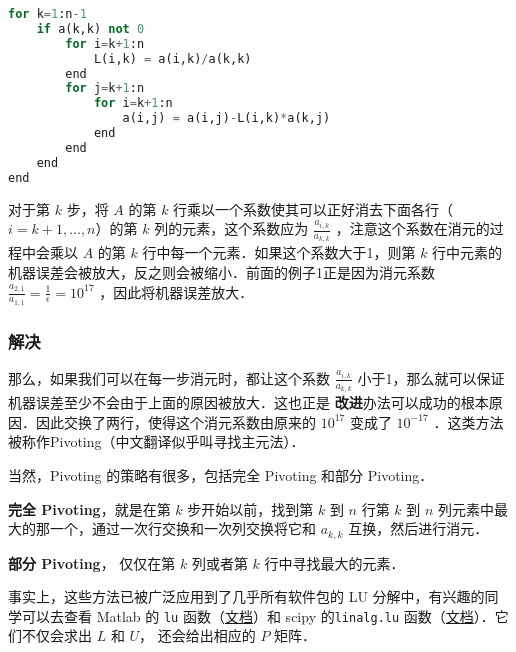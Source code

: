 \begin{lstlisting}[language=python]
for k=1:n-1
    if a(k,k) not 0
        for i=k+1:n
            L(i,k) = a(i,k)/a(k,k)
        end
        for j=k+1:n
            for i=k+1:n
                a(i,j) = a(i,j)-L(i,k)*a(k,j)
            end
        end
    end
end
\end{lstlisting}

对于第  $k$  步，将 $A$  的第  $k$  行乘以一个系数使其可以正好消去下面各行（$i=k+1,...,n$）的第 $k$ 列的元素，这个系数应为  $\frac{a_{i,k}}{a_{k,k}}$  ，注意这个系数在消元的过程中会乘以  $A$  的第  $k $  行中每一个元素．如果这个系数大于1，则第  $k $  行中元素的机器误差会被放大，反之则会被缩小．前面的例子1正是因为消元系数  $\frac{a_{2,1}}{a_{1,1}}=\frac{1}{\epsilon}=10^{17}$  ，因此将机器误差放大．

\subsubsection{解决}

那么，如果我们可以在每一步消元时，都让这个系数  $\frac{a_{i,k}}{a_{k,k}}$ 小于1，那么就可以保证机器误差至少不会由于上面的原因被放大．这也正是	\textbf{改进}办法可以成功的根本原因．因此交换了两行，使得这个消元系数由原来的  $10^{17}$  变成了  $10^{-17}$  ．这类方法被称作Pivoting（中文翻译似乎叫寻找主元法）．

当然，Pivoting 的策略有很多，包括完全 Pivoting 和部分 Pivoting．

\textbf{完全 Pivoting}，就是在第  $k$ 步开始以前，找到第  $k$  到  $n$  行第  $k$  到  $n$  列元素中最大的那一个，通过一次行交换和一次列交换将它和  $a_{k,k}$  互换，然后进行消元．

\textbf{部分 Pivoting}， 仅仅在第 $k$ 列或者第 $k$ 行中寻找最大的元素．

事实上，这些方法已被广泛应用到了几乎所有软件包的 LU 分解中，有兴趣的同学可以去查看 Matlab 的 \verb|lu| 函数（\href{https://ww2.mathworks.cn/help/matlab/ref/lu.html}{文档}）和 scipy 的\verb|linalg.lu| 函数（\href{https://docs.scipy.org/doc/scipy/reference/generated/scipy.linalg.lu.html}{文档}）．它们不仅会求出 $L$ 和 $U$， 还会给出相应的 $P$ 矩阵．
